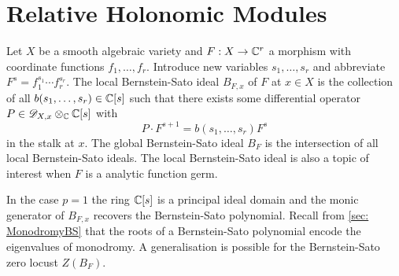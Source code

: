 \chapter{Relative Holonomic Modules}\label{ch: ChapterRelHol}
Let $X$ be a smooth algebraic variety and $F:X\to \mathbb{C}^r$ a morphism with coordinate functions $f_1,\ldots, f_r$.
Introduce new variables $s_1,\ldots, s_r$ and abbreviate $F^s = f_1^{s_1}\cdots f_r^{s_r}$.
The local Bernstein-Sato ideal $B_{F,x}$ of $F$ at $x\in X$ is the collection of all $b(s_1,\ldots,s_r)\in \mathbb{C}[s]$ such that there exists some differential operator $P\in \mathscr{D}_{X,x}\otimes_{\mathbb{C}}\mathbb{C}[s]$ with
$$P\cdot F^{s + 1} =  b(s_1,\ldots,s_r) F^s$$
in the stalk at $x$.
The global Bernstein-Sato ideal $B_F$ is the intersection of all local Bernstein-Sato ideals.
The local Bernstein-Sato ideal is also a topic of interest when $F$ is a analytic function germ.

In the case $p=1$ the ring $\mathbb{C}[s]$ is a principal ideal domain and the monic generator of $B_{F,x}$ recovers the Bernstein-Sato polynomial.
Recall from \cref{sec: MonodromyBS} that the roots of a Bernstein-Sato polynomial encode the eigenvalues of monodromy.
A generalisation is possible for the Bernstein-Sato zero locust $Z(B_F)$.

